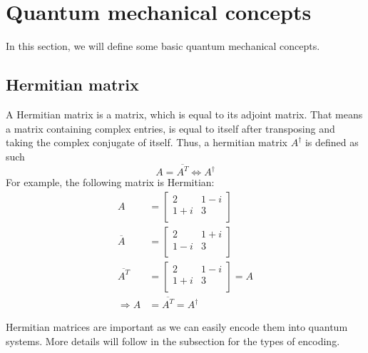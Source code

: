 \section{Quantum mechanical concepts}
In this section, we will define some basic quantum mechanical concepts. 

\subsection{Hermitian matrix}
A Hermitian matrix is a matrix, which is equal to its adjoint matrix. 
That means a matrix containing complex entries, is equal to itself after transposing and taking the complex conjugate of itself. 
Thus, a hermitian matrix $A^\dagger$ is defined as such
\begin{equation}
 A = \overline{A^T} \Leftrightarrow A^\dagger
\end{equation}
For example, the following matrix is Hermitian:
\begin{equation}
\begin{split}
A &= \begin{bmatrix} 2 & 1-i \\ 1+i & 3 \\ \end{bmatrix} \\
\overline A &= \begin{bmatrix} 2 & 1+i \\ 1-i & 3 \\ \end{bmatrix}\\
\overline{A^T} &= \begin{bmatrix} 2 & 1-i \\ 1+i & 3 \\ \end{bmatrix} = A\\
\Rightarrow A &= \overline{A^T} = A^\dagger
\end{split}
\end{equation}

Hermitian matrices are important as we can easily encode them into quantum systems.
More details will follow in the subsection for the types of encoding.


